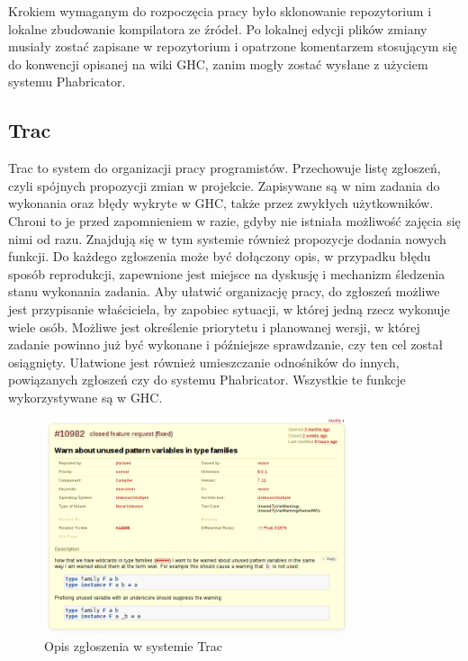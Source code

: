 Krokiem wymaganym do rozpoczęcia pracy było sklonowanie repozytorium i lokalne
zbudowanie kompilatora ze źródeł. Po lokalnej edycji plików zmiany musiały
zostać zapisane w repozytorium i opatrzone komentarzem stosującym się do
konwencji opisanej na wiki GHC, zanim mogły zostać wysłane z użyciem systemu
Phabricator.

\subsection{Trac}

Trac to system do organizacji pracy programistów. Przechowuje listę zgłoszeń,
czyli spójnych propozycji zmian w projekcie. Zapisywane są w nim zadania do
wykonania oraz błędy wykryte w GHC, także przez zwykłych użytkowników. Chroni to
je przed zapomnieniem w razie, gdyby nie istniała możliwość zajęcia się nimi od
razu. Znajdują się w tym systemie również propozycje dodania nowych funkcji. Do
każdego zgłoszenia może być dołączony opis, w przypadku błędu sposób
reprodukcji, zapewnione jest miejsce na dyskusję i mechanizm śledzenia stanu
wykonania zadania. Aby ułatwić organizację pracy, do zgłoszeń możliwe jest
przypisanie właściciela, by zapobiec sytuacji, w której jedną rzecz wykonuje
wiele osób. Możliwe jest określenie priorytetu i planowanej wersji, w której
zadanie powinno już być wykonane i późniejsze sprawdzanie, czy ten cel został
osiągnięty. Ułatwione jest również umieszczanie odnośników do innych,
powiązanych zgłoszeń czy do systemu Phabricator. Wszystkie te funkcje
wykorzystywane są w GHC.

\begin{figure}[ht]
    \centering
    \includegraphics[width=0.8\textwidth]{images/Trac_description}
    \caption{Opis zgłoszenia w systemie Trac}
    \label{fig:Trac_description}
\end{figure}

